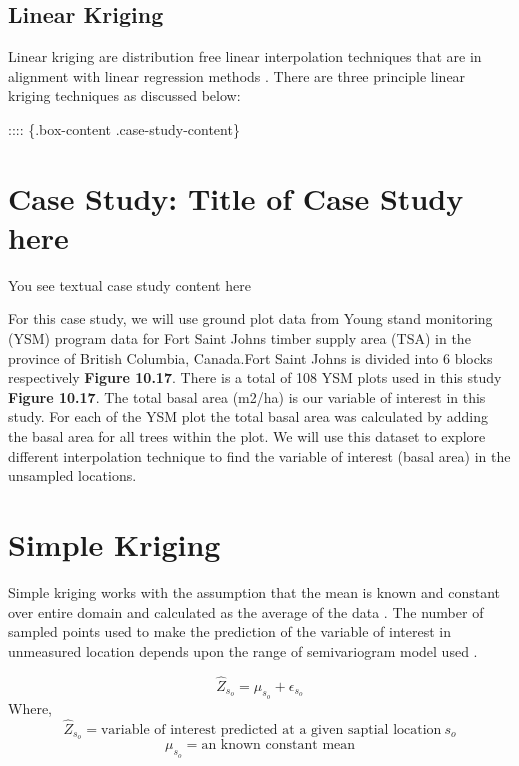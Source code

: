 \documentclass[
]{book}
\begin{document}
\hypertarget{linear-kriging}{%
\subsection{Linear Kriging}\label{linear-kriging}}

Linear kriging are distribution free linear interpolation techniques that are in alignment with linear regression methods \citep{Asa2012}. There are three principle linear kriging techniques as discussed below:

:::: \{.box-content .case-study-content\}

\hypertarget{case-study-title-of-case-study-here-5}{%
\section{Case Study: Title of Case Study here}\label{case-study-title-of-case-study-here-5}}

You see textual case study content here

For this case study, we will use ground plot data from Young stand monitoring (YSM) program data \citep{ProvinceofBC2018} for Fort Saint Johns timber supply area (TSA) in the province of British Columbia, Canada.Fort Saint Johns is divided into 6 blocks respectively \textbf{Figure 10.17}. There is a total of 108 YSM plots used in this study \textbf{Figure 10.17}. The total basal area (m2/ha) is our variable of interest in this study. For each of the YSM plot the total basal area was calculated by adding the basal area for all trees within the plot. We will use this dataset to explore different interpolation technique to find the variable of interest (basal area) in the unsampled locations.

\hypertarget{simple-kriging}{%
\section{Simple Kriging}\label{simple-kriging}}

Simple kriging works with the assumption that the mean is known and constant over entire domain and calculated as the average of the data \citep{Wackernagel2002}. The number of sampled points used to make the prediction of the variable of interest in unmeasured location depends upon the range of semivariogram model used \citep{Burrough1998}.

\[\hat{Z}_{s_o}=\mu_{s_o} + \epsilon_{s_o}\]
Where, \[\hat{Z}_{s_o}=\text{variable of interest predicted at a given saptial location}\ s_{o}\]
\[\mu_{s_o}=\text{an known constant mean} \]
\end{document}
